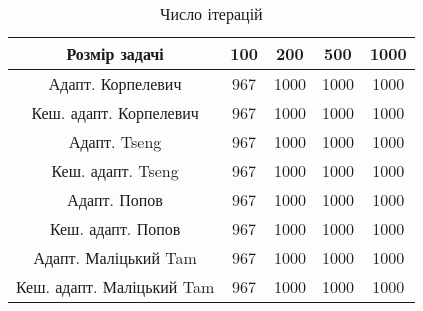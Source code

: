 \begin{table}[H]
	\centering
	\begin{tabular}{|c||c|c|c|c|}\hline
		Розмір задачі & 100 & 200 & 500 & 1000 \\ \hline \hline
		Адапт. Корпелевич & 967 & 1000 & 1000 & 1000 \\ \hline
		Кеш. адапт. Корпелевич & 967 & 1000 & 1000 & 1000 \\ \hline
		Адапт. Tseng & 967 & 1000 & 1000 & 1000 \\ \hline
		Кеш. адапт. Tseng & 967 & 1000 & 1000 & 1000 \\ \hline
		Адапт. Попов & 967 & 1000 & 1000 & 1000 \\ \hline
		Кеш. адапт. Попов & 967 & 1000 & 1000 & 1000 \\ \hline
		Адапт. Маліцький Tam & 967 & 1000 & 1000 & 1000 \\ \hline
		Кеш. адапт. Маліцький Tam & 967 & 1000 & 1000 & 1000 \\ \hline
	\end{tabular}
	\caption{Число ітерацій}
\end{table}
